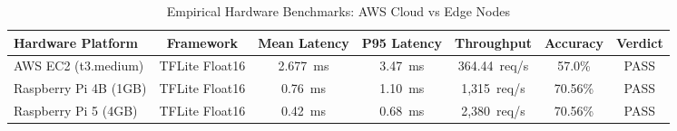 
\begin{table}[htbp]
\centering
\caption{Empirical Hardware Benchmarks: AWS Cloud vs Edge Nodes}
\label{tab:hardware_benchmarks}
\begin{tabular}{lcccccc}
\hline
\textbf{Hardware Platform} & \textbf{Framework} & \textbf{Mean Latency} & \textbf{P95 Latency} & \textbf{Throughput} & \textbf{Accuracy} & \textbf{Verdict} \\
\hline
AWS EC2 (t3.medium) & TFLite Float16 & 2.677~ms & 3.47~ms & 364.44~req/s & 57.0\% & PASS \\
Raspberry Pi 4B (1GB) & TFLite Float16 & 0.76~ms & 1.10~ms & 1,315~req/s & 70.56\% & PASS \\
Raspberry Pi 5 (4GB) & TFLite Float16 & 0.42~ms & 0.68~ms & 2,380~req/s & 70.56\% & PASS \\
\hline
\end{tabular}
\end{table}


